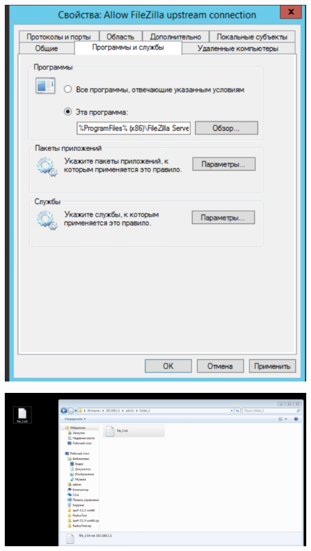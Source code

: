 \documentclass[a4paper,14pt]{extarticle}
\begin{document}
    \begin{center}
        \includegraphics[scale=0.7]{9.1.2.png}
    \end{center}

    \begin{center}
        \includegraphics[scale=0.4]{9.1.3.png}
    \end{center}
\end{document}
